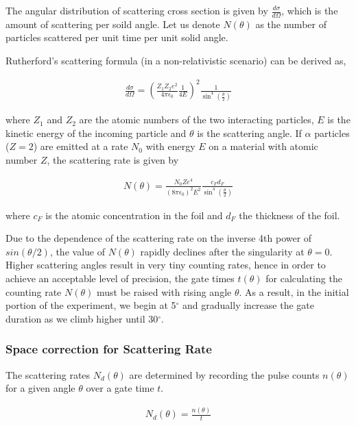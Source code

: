 The angular distribution of scattering cross section is given by $\frac{d\sigma}{d\Omega}$, which is the amount of scattering per soild angle. Let us denote $N(\theta)$ as the number of particles scattered per unit time per unit solid angle.

Rutherford's scattering formula (in a non-relativistic scenario) can be derived as,

\begin{align}
    \frac{d\sigma}{d\Omega} = \left(\frac{Z_1 Z_2e^2}{4\pi\epsilon_0} \frac{1}{4E}\right)^2 \frac{1}{\sin^4(\frac{\theta}{2})}
\end{align}

where $Z_1$ and $Z_2$ are the atomic numbers of the two interacting particles, $E$ is the kinetic energy of the incoming particle and $\theta$ is the scattering angle. If $\alpha$ particles ($Z=2$) are emitted at a rate $N_0$ with energy $E$ on a material with atomic number $Z$, the scattering rate is given by

\begin{align} \label{eq:2}
    N(\theta) = \frac{N_0Ze^4}{(8\pi\epsilon_0)^2 E^2} \frac{c_F d_F}{\sin^4(\frac{\theta}{2})}
\end{align}

where $c_F$ is the atomic concentration in the foil and $d_F$
the thickness of the foil.

Due to the dependence of the scattering rate on the inverse 4th power of $sin(\theta/2)$, the value of $N(\theta)$ rapidly declines after the singularity at $\theta=0$. 
Higher scattering angles result in very tiny counting
rates, hence in order to achieve an acceptable level of
precision, the gate times $t(\theta)$ for calculating the counting rate $N (\theta)$ must be raised with rising angle $\theta$. As a result, in the initial portion of the experiment, we begin at 5$^\circ$ and gradually increase the gate duration as we climb higher until 30$^\circ$.

\subsubsection*{Space correction for Scattering Rate}
The scattering rates $N_d(\theta)$ are determined by recording the pulse counts $n(\theta)$ for a given angle $\theta$ over a gate time $t$.

\begin{align}
    N_d(\theta) = \frac{n(\theta)}{t}
\end{align}


